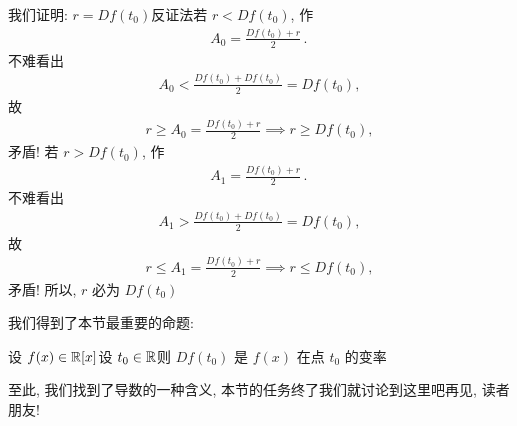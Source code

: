 我们证明: $r = Df(t_0)$\period 反证法\period 若 $r < Df(t_0)$, 作
\begin{align*}
    A_0 = \frac{Df(t_0) + r}{2} \period
\end{align*}
不难看出
\begin{align*}
    A_0 < \frac{Df(t_0) + Df(t_0)}{2} = Df(t_0),
\end{align*}
故
\begin{align*}
    r \geq A_0 = \frac{Df(t_0) + r}{2} \implies r \geq Df(t_0),
\end{align*}
矛盾! 若 $r > Df(t_0)$, 作
\begin{align*}
    A_1 = \frac{Df(t_0) + r}{2} \period
\end{align*}
不难看出
\begin{align*}
    A_1 > \frac{Df(t_0) + Df(t_0)}{2} = Df(t_0),
\end{align*}
故
\begin{align*}
    r \leq A_1 = \frac{Df(t_0) + r}{2} \implies r \leq Df(t_0),
\end{align*}
矛盾! 所以, $r$ 必为 $Df(t_0)$\period

我们得到了本节最重要的命题:

\begin{proposition}
    设 $f (x) \in \mathbb{R}[x]$\period 设 $t_0 \in \mathbb{R}$\period 则 $Df(t_0)$ 是 $f(x)$ 在点 $t_0$ 的变率\period
\end{proposition}

至此, 我们找到了导数的一种含义, 本节的任务终了\period 我们就讨论到这里吧\period 再见, 读者朋友!
